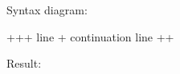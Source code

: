 \documentclass[letterpaper,12pt,english]{sphinxmanual}
\begin{document}
Syntax diagram:

\begin{sphinxVerbatim}[commandchars=\\\{\}]
+\PYGZhy{}\PYGZhy{}\PYGZhy{}\PYGZhy{}\PYGZhy{}\PYGZhy{}+\PYGZhy{}\PYGZhy{}\PYGZhy{}\PYGZhy{}\PYGZhy{}\PYGZhy{}\PYGZhy{}\PYGZhy{}\PYGZhy{}\PYGZhy{}\PYGZhy{}\PYGZhy{}\PYGZhy{}\PYGZhy{}\PYGZhy{}\PYGZhy{}\PYGZhy{}\PYGZhy{}\PYGZhy{}\PYGZhy{}\PYGZhy{}\PYGZhy{}\PYGZhy{}+
 \PYGZdq{}\textbar{} \PYGZdq{} \textbar{} line                  \textbar{}
+\PYGZhy{}\PYGZhy{}\PYGZhy{}\PYGZhy{}\PYGZhy{}\PYGZhy{}\textbar{} continuation line     \textbar{}
       +\PYGZhy{}\PYGZhy{}\PYGZhy{}\PYGZhy{}\PYGZhy{}\PYGZhy{}\PYGZhy{}\PYGZhy{}\PYGZhy{}\PYGZhy{}\PYGZhy{}\PYGZhy{}\PYGZhy{}\PYGZhy{}\PYGZhy{}\PYGZhy{}\PYGZhy{}\PYGZhy{}\PYGZhy{}\PYGZhy{}\PYGZhy{}\PYGZhy{}\PYGZhy{}+
\end{sphinxVerbatim}

Result:
\end{document}
